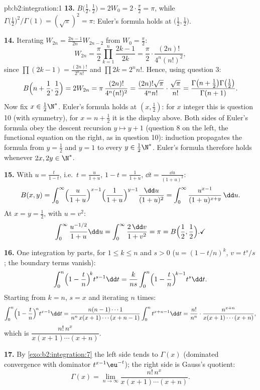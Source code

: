 \begin{solution}{pb:b2:integration:1}
\textbf{13.} $B\bigl(\frac12,\frac12\bigr) = 2W_0 =
2\cdot\frac\pi2 = \pi$, while
$\Gamma\bigl(\frac12\bigr)^2/\Gamma(1) = (\sqrt\pi)^2 = \pi$:
Euler's formula holds at $\bigl(\frac12,\frac12\bigr)$.

\textbf{14.} Iterating $W_{2n} = \frac{2n-1}{2n}W_{2n-2}$ from
$W_0 = \frac\pi2$:
\[
W_{2n} = \frac\pi2\prod_{k=1}^{n}\frac{2k-1}{2k}
= \frac\pi2\cdot\frac{(2n)!}{4^n(n!)^2},
\]
since $\prod(2k-1) = \frac{(2n)!}{2^n n!}$ and $\prod 2k = 2^n
n!$. Hence, using question 3:
\[
B\Bigl(n+\frac12, \frac12\Bigr) = 2W_{2n}
= \pi\,\frac{(2n)!}{4^n(n!)^2}
= \frac{(2n)!\sqrt\pi}{4^n n!}\cdot\frac{\sqrt\pi}{n!}
= \frac{\Gamma\bigl(n+\frac12\bigr)\Gamma\bigl(\frac12\bigr)}
{\Gamma(n+1)} .
\]
Now fix $x \in \frac12\N^*$. Euler's formula holds at $(x,
\frac12)$: for $x$ integer this is question 10 (with symmetry),
for $x = n + \frac12$ it is the display above. Both sides of
Euler's formula obey the descent recursion $y \mapsto y + 1$
(question 8 on the left, the functional equation on the right,
as in question 10): induction propagates the formula from $y =
\frac12$ and $y = 1$ to every $y \in \frac12\N^*$. Euler's
formula therefore holds whenever $2x, 2y \in \N^*$.

\textbf{15.} With $u = \frac{t}{1-t}$, i.e.\ $t =
\frac{u}{1+u}$, $1 - t = \frac{1}{1+u}$, $\dd t =
\frac{\dd u}{(1+u)^2}$:
\[
B(x,y) = \int_0^\infty
\Bigl(\frac{u}{1+u}\Bigr)^{x-1}
\Bigl(\frac{1}{1+u}\Bigr)^{y-1}
\frac{\dd u}{(1+u)^2}
= \int_0^\infty \frac{u^{x-1}}{(1+u)^{x+y}}\,\dd u .
\]
At $x = y = \frac12$, with $u = v^2$:
\[
\int_0^\infty \frac{u^{-1/2}}{1+u}\dd u
= \int_0^\infty \frac{2\,\dd v}{1+v^2} = \pi
= B\Bigl(\frac12,\frac12\Bigr) . \checkmark
\]

\textbf{16.} One integration by parts, for $1 \leq k \leq n$
and $s > 0$ ($u = (1 - t/n)^k$, $v = t^s/s$; the boundary terms
vanish):
\[
\int_0^n \Bigl(1-\frac tn\Bigr)^{\!k} t^{s-1}\dd t
= \frac{k}{ns}\int_0^n \Bigl(1-\frac tn\Bigr)^{\!k-1}
t^{s}\dd t .
\]
Starting from $k = n$, $s = x$ and iterating $n$ times:
\[
\int_0^n \Bigl(1-\frac tn\Bigr)^{\!n} t^{x-1}\dd t
= \frac{n(n-1)\cdots1}{n^n\,x(x+1)\cdots(x+n-1)}
\int_0^n t^{x+n-1}\dd t
= \frac{n!}{n^n}\cdot
\frac{n^{x+n}}{x(x+1)\cdots(x+n)} ,
\]
which is $\dfrac{n!\,n^x}{x(x+1)\cdots(x+n)}$.

\textbf{17.} By \cref{exo:b2:integration:7} the left side tends
to $\Gamma(x)$ (dominated convergence with dominator
$t^{x-1}\eu^{-t}$); the right side is Gauss's quotient:
\[
\Gamma(x) = \lim_{n\to\infty}
\frac{n!\,n^x}{x(x+1)\cdots(x+n)} .
\]


\end{solution}
